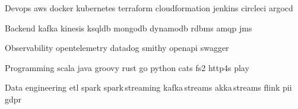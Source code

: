 
\begin{cvskills}

  \cvskill
    {Devops} %
    {aws {} docker {} kubernetes {} terraform {} cloudformation {} jenkins {} circleci {} argocd} %

  \cvskill
    {Backend} %
    {kafka {} kinesis {} ksqldb {} mongodb {} dynamodb {} rdbms {} amqp {} jms} %

\cvskill
    {Observability} %
    {opentelemetry {} datadog {} smithy {} openapi {} swagger} %

  \cvskill
    {Programming} %
    {scala {} java {} groovy {} rust {} go {} python {} cats {} fs2 {} http4s {} play} %

\cvskill
    {Data engineering} %
    {etl {} spark {} spark\,streaming {} kafka\,streams {} akka\,streams {} flink {} pii {} gdpr} %

\end{cvskills}
